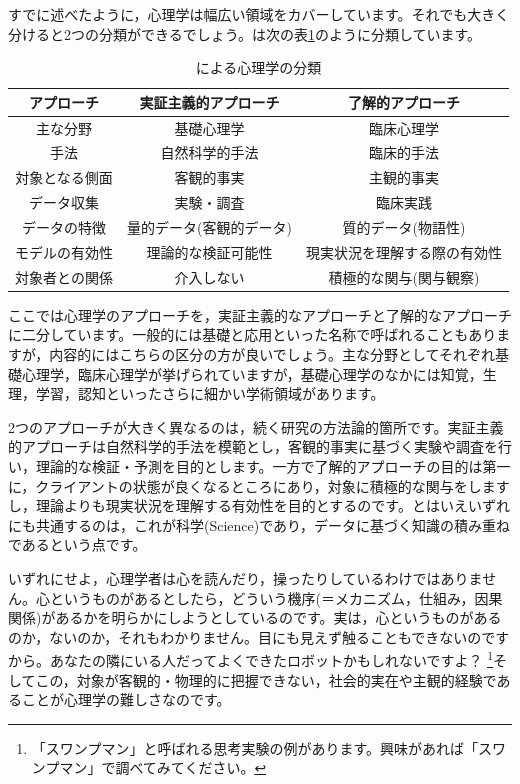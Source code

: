 \documentclass{ltjsbook}
\begin{document}
すでに述べたように，心理学は幅広い領域をカバーしています。それでも大きく分けると2つの分類ができるでしょう。\textcite{Shimoyama2001}は次の表\ref{tbl:01_01}のように分類しています。

\begin{table}[hb]
	\centering
	\caption{\textcite{Shimoyama2001}による心理学の分類}
	\begin{tabular}{ccc}
		アプローチ   & 実証主義的アプローチ    & 了解的アプローチ       \\\hline
		主な分野    & 基礎心理学         & 臨床心理学          \\
		手法      & 自然科学的手法       & 臨床的手法          \\
		対象となる側面 & 客観的事実         & 主観的事実          \\
		データ収集   & 実験・調査         & 臨床実践           \\
		データの特徴  & 量的データ(客観的データ) & 質的データ(物語性)     \\
		モデルの有効性 & 理論的な検証可能性     & 現実状況を理解する際の有効性 \\
		対象者との関係 & 介入しない         & 積極的な関与(関与観察)   \\\hline
	\end{tabular}
	\label{tbl:01_01}
\end{table}
ここでは心理学のアプローチを，実証主義的なアプローチと了解的なアプローチに二分しています。一般的には基礎と応用といった名称で呼ばれることもありますが，内容的にはこちらの区分の方が良いでしょう。主な分野としてそれぞれ基礎心理学，臨床心理学が挙げられていますが，基礎心理学のなかには知覚，生理，学習，認知といったさらに細かい学術領域があります。

2つのアプローチが大きく異なるのは，続く研究の方法論的箇所です。実証主義的アプローチは自然科学的手法を模範とし，客観的事実に基づく実験や調査を行い，理論的な検証・予測を目的とします。一方で了解的アプローチの目的は第一に，クライアントの状態が良くなるところにあり，対象に積極的な関与をしますし，理論よりも現実状況を理解する有効性を目的とするのです。とはいえいずれにも共通するのは，これが科学(Science)であり，データに基づく知識の積み重ねであるという点です。

いずれにせよ，心理学者は心を読んだり，操ったりしているわけではありません。心というものがあるとしたら，どういう機序(＝メカニズム，仕組み，因果関係)があるかを明らかにしようとしているのです。実は，心というものがあるのか，ないのか，それもわかりません。目にも見えず触ることもできないのですから。あなたの隣にいる人だってよくできたロボットかもしれないですよ？ \footnote{「スワンプマン」と呼ばれる思考実験の例があります。興味があれば「スワンプマン」で調べてみてください。}そしてこの，対象が客観的・物理的に把握できない，社会的実在や主観的経験であることが心理学の難しさなのです。
\end{document}
